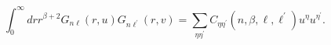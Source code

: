 \begin{equation}
\int_{0}^{\infty }drr^{\beta +2}G_{n\ell }\left( r,u\right) G_{n\ell
^{\prime }}\left( r,v\right) =\sum_{\eta \eta ^{\prime }}C_{\eta \eta
^{\prime }}\left( n,\beta ,\ell ,\ell ^{\prime }\right) u^{\eta }u^{\eta
^{\prime }}.
\end{equation}

